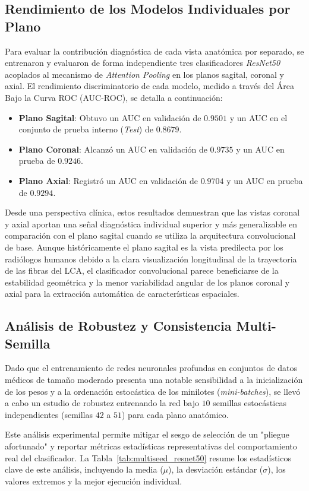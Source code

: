 \subsection{Rendimiento de los Modelos Individuales por Plano}
Para evaluar la contribución diagnóstica de cada vista anatómica por separado, se entrenaron y evaluaron de forma independiente tres clasificadores \textit{ResNet50} acoplados al mecanismo de \textit{Attention Pooling} en los planos sagital, coronal y axial. El rendimiento discriminatorio de cada modelo, medido a través del Área Bajo la Curva ROC (AUC-ROC), se detalla a continuación:
\begin{itemize}
    \item \textbf{Plano Sagital}: Obtuvo un AUC en validación de $0.9501$ y un AUC en el conjunto de prueba interno (\textit{Test}) de $0.8679$.
    \item \textbf{Plano Coronal}: Alcanzó un AUC en validación de $0.9735$ y un AUC en prueba de $0.9246$.
    \item \textbf{Plano Axial}: Registró un AUC en validación de $0.9704$ y un AUC en prueba de $0.9294$.
\end{itemize}

Desde una perspectiva clínica, estos resultados demuestran que las vistas coronal y axial aportan una señal diagnóstica individual superior y más generalizable en comparación con el plano sagital cuando se utiliza la arquitectura convolucional de base. Aunque históricamente el plano sagital es la vista predilecta por los radiólogos humanos debido a la clara visualización longitudinal de la trayectoria de las fibras del LCA, el clasificador convolucional parece beneficiarse de la estabilidad geométrica y la menor variabilidad angular de los planos coronal y axial para la extracción automática de características espaciales.

\subsection{Análisis de Robustez y Consistencia Multi-Semilla}
Dado que el entrenamiento de redes neuronales profundas en conjuntos de datos médicos de tamaño moderado presenta una notable sensibilidad a la inicialización de los pesos y a la ordenación estocástica de los minilotes (\textit{mini-batches}), se llevó a cabo un estudio de robustez entrenando la red bajo $10$ semillas estocásticas independientes (semillas $42$ a $51$) para cada plano anatómico. 

Este análisis experimental permite mitigar el sesgo de selección de un "pliegue afortunado" y reportar métricas estadísticas representativas del comportamiento real del clasificador. La Tabla~\ref{tab:multiseed_resnet50} resume los estadísticos clave de este análisis, incluyendo la media ($\mu$), la desviación estándar ($\sigma$), los valores extremos y la mejor ejecución individual.

